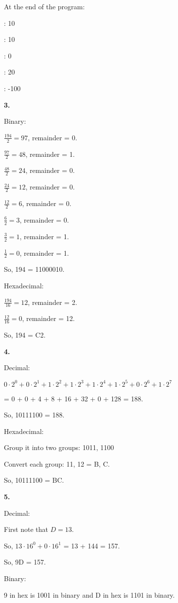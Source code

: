 \documentclass{article}
\newcommand{\lskip}{\newpage}
\begin{document}
At the end of the program:

: 10

: 10

: 0

: 20

: -100

\lskip

\textbf{3.}

Binary:

$\frac{194}{2} = 97$, remainder = 0.

$\frac{97}{2} = 48$, remainder = 1.

$\frac{48}{2} = 24$, remainder = 0.

$\frac{24}{2} = 12$, remainder = 0.

$\frac{12}{2} = 6$, remainder = 0.

$\frac{6}{2} = 3$, remainder = 0.

$\frac{3}{2} = 1$, remainder = 1.

$\frac{1}{2} = 0$, remainder = 1.

So, 194 = 11000010.

Hexadecimal:

$\frac{194}{16} = 12$, remainder = 2.

$\frac{12}{16} = 0$, remainder = 12.

So, 194 = C2.

\lskip

\textbf{4.}

Decimal:

$0 \cdot 2^0 + 0 \cdot 2^1 + 1 \cdot 2^2 + 1 \cdot 2^3 + 1 \cdot 2^4 + 1 \cdot 2^5 + 0 \cdot 2^6 + 1 \cdot 2^7$

= 0 + 0 + 4 + 8 + 16 + 32 + 0 + 128 = 188.

So, 10111100 = 188.

Hexadecimal:

Group it into two groups: 1011, 1100

Convert each group: 11, 12 = B, C.

So, 10111100 = BC.

\lskip

\textbf{5.}

Decimal:

First note that $D = 13$.

So, $13 \cdot 16^0 + 0 \cdot 16^1$ = 13 + 144 = 157.

So, 9D = 157.

Binary:

9 in hex is 1001 in binary and D in hex is 1101 in binary.
\end{document}
